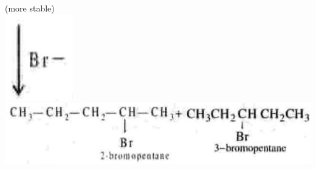 \documentclass[10pt]{article}
\begin{document}
(more stable)\\
\includegraphics[max width=\textwidth, center]{2025_01_28_8470952b98110cec3aabg-243(5)}\\
\includegraphics[max width=\textwidth, center]{2025_01_28_8470952b98110cec3aabg-243(3)}
\end{document}
